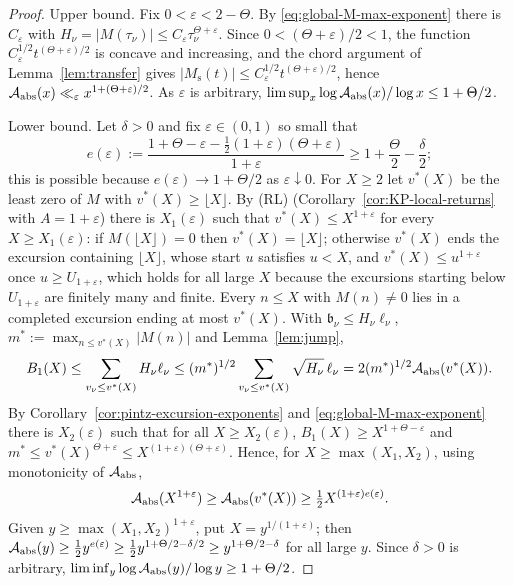 \documentclass[11pt,reqno]{amsart}
\numberwithin{equation}{section}
\theoremstyle{plain}
\theoremstyle{definition}
\theoremstyle{remark}
\newcommand{\Ms}{M_{\mathrm{s}}}
\newcommand{\eps}{\varepsilon}
\begin{document}
\begin{proof}
Upper bound. Fix $0<\eps<2-\Theta$. By \eqref{eq:global-M-max-exponent}
there is $C_\eps$ with $H_\nu=|M(\tau_\nu)|\le C_\eps\tau_\nu^{\Theta+\eps}$.
Since $0<(\Theta+\eps)/2<1$, the function $C_\eps^{1/2}t^{(\Theta+\eps)/2}$ is
concave and increasing, and the chord argument of Lemma~\ref{lem:transfer}
gives $|\Ms(t)|\le C_\eps^{1/2}t^{(\Theta+\eps)/2}$, hence
$\mathcal A_{\rm abs}(x)\ll_\eps x^{1+(\Theta+\eps)/2}$. As $\eps$ is
arbitrary, $\limsup_x\log\mathcal A_{\rm abs}(x)/\log x\le1+\Theta/2$.

Lower bound. Let $\delta>0$ and fix $\eps\in(0,1)$ so small that
\begin{equation}
e(\eps):=\frac{1+\Theta-\eps-\frac12(1+\eps)(\Theta+\eps)}{1+\eps}
\ge1+\frac\Theta2-\frac\delta2 ;
\end{equation}
this is possible because $e(\eps)\to1+\Theta/2$ as $\eps\downarrow0$. For
$X\ge2$ let $v^*(X)$ be the least zero of $M$ with $v^*(X)\ge\lfloor X\rfloor$.
By (RL) (Corollary~\ref{cor:KP-local-returns} with $A=1+\eps$) there is
$X_1(\eps)$ such that $v^*(X)\le X^{1+\eps}$ for every $X\ge X_1(\eps)$: if
$M(\lfloor X\rfloor)=0$ then $v^*(X)=\lfloor X\rfloor$; otherwise $v^*(X)$
ends the excursion containing $\lfloor X\rfloor$, whose start $u$ satisfies
$u<X$, and $v^*(X)\le u^{1+\eps}$ once $u\ge U_{1+\eps}$, which holds for all
large $X$ because the excursions starting below $U_{1+\eps}$ are finitely many
and finite. Every $n\le X$ with $M(n)\ne0$ lies in a completed excursion
ending at most $v^*(X)$. With $\mathfrak b_\nu\le H_\nu\ell_\nu$,
$m^*:=\max_{n\le v^*(X)}|M(n)|$ and Lemma~\ref{lem:jump},
\begin{equation}
B_1(X)\le\sum_{v_\nu\le v^*(X)}H_\nu\ell_\nu
\le(m^*)^{1/2}\sum_{v_\nu\le v^*(X)}\sqrt{H_\nu}\,\ell_\nu
=2(m^*)^{1/2}\mathcal A_{\rm abs}(v^*(X)).
\end{equation}
By Corollary~\ref{cor:pintz-excursion-exponents} and
\eqref{eq:global-M-max-exponent} there is $X_2(\eps)$ such that for all
$X\ge X_2(\eps)$, $B_1(X)\ge X^{1+\Theta-\eps}$ and
$m^*\le v^*(X)^{\Theta+\eps}\le X^{(1+\eps)(\Theta+\eps)}$. Hence, for
$X\ge\max(X_1,X_2)$, using monotonicity of $\mathcal A_{\rm abs}$,
\begin{equation}
\mathcal A_{\rm abs}(X^{1+\eps})\ge\mathcal A_{\rm abs}(v^*(X))
\ge\tfrac12X^{(1+\eps)e(\eps)} .
\end{equation}
Given $y\ge\max(X_1,X_2)^{1+\eps}$, put $X=y^{1/(1+\eps)}$; then
$\mathcal A_{\rm abs}(y)\ge\frac12y^{e(\eps)}\ge\frac12y^{1+\Theta/2-\delta/2}
\ge y^{1+\Theta/2-\delta}$ for all large $y$. Since $\delta>0$ is arbitrary,
$\liminf_y\log\mathcal A_{\rm abs}(y)/\log y\ge1+\Theta/2$.
\end{proof}
\end{document}
